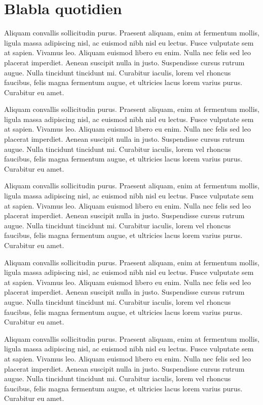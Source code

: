 \section{Blabla quotidien}

Aliquam convallis sollicitudin purus. Praesent aliquam, enim at fermentum mollis, ligula massa adipiscing nisl, ac euismod nibh nisl eu lectus. Fusce vulputate sem at sapien. Vivamus leo. Aliquam euismod libero eu enim. Nulla nec felis sed leo placerat imperdiet. Aenean suscipit nulla in justo. Suspendisse cursus rutrum augue. Nulla tincidunt tincidunt mi. Curabitur iaculis, lorem vel rhoncus faucibus, felis magna fermentum augue, et ultricies lacus lorem varius purus. Curabitur eu amet.

\vspace{10pt}

Aliquam convallis sollicitudin purus. Praesent aliquam, enim at fermentum mollis, ligula massa adipiscing nisl, ac euismod nibh nisl eu lectus. Fusce vulputate sem at sapien. Vivamus leo. Aliquam euismod libero eu enim. Nulla nec felis sed leo placerat imperdiet. Aenean suscipit nulla in justo. Suspendisse cursus rutrum augue. Nulla tincidunt tincidunt mi. Curabitur iaculis, lorem vel rhoncus faucibus, felis magna fermentum augue, et ultricies lacus lorem varius purus. Curabitur eu amet.

Aliquam convallis sollicitudin purus. Praesent aliquam, enim at fermentum mollis, ligula massa adipiscing nisl, ac euismod nibh nisl eu lectus. Fusce vulputate sem at sapien. Vivamus leo. Aliquam euismod libero eu enim. Nulla nec felis sed leo placerat imperdiet. Aenean suscipit nulla in justo. Suspendisse cursus rutrum augue. Nulla tincidunt tincidunt mi. Curabitur iaculis, lorem vel rhoncus faucibus, felis magna fermentum augue, et ultricies lacus lorem varius purus. Curabitur eu amet.

Aliquam convallis sollicitudin purus. Praesent aliquam, enim at fermentum mollis, ligula massa adipiscing nisl, ac euismod nibh nisl eu lectus. Fusce vulputate sem at sapien. Vivamus leo. Aliquam euismod libero eu enim. Nulla nec felis sed leo placerat imperdiet. Aenean suscipit nulla in justo. Suspendisse cursus rutrum augue. Nulla tincidunt tincidunt mi. Curabitur iaculis, lorem vel rhoncus faucibus, felis magna fermentum augue, et ultricies lacus lorem varius purus. Curabitur eu amet.

Aliquam convallis sollicitudin purus. Praesent aliquam, enim at fermentum mollis, ligula massa adipiscing nisl, ac euismod nibh nisl eu lectus. Fusce vulputate sem at sapien. Vivamus leo. Aliquam euismod libero eu enim. Nulla nec felis sed leo placerat imperdiet. Aenean suscipit nulla in justo. Suspendisse cursus rutrum augue. Nulla tincidunt tincidunt mi. Curabitur iaculis, lorem vel rhoncus faucibus, felis magna fermentum augue, et ultricies lacus lorem varius purus. Curabitur eu amet.

